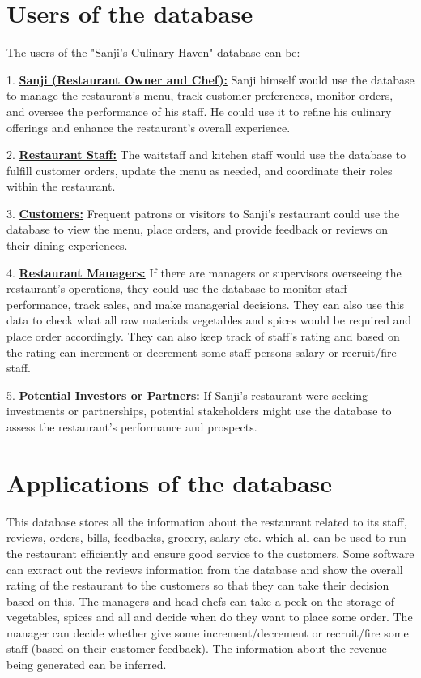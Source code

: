 \documentclass{article}
\begin{document}
\section{Users of the database}
The users of the "Sanji's Culinary Haven" database can be:

1. \underline{\textbf{Sanji (Restaurant Owner and Chef):}} Sanji himself would use the database to manage the restaurant's menu, track customer preferences, monitor orders, and oversee the performance of his staff. He could use it to refine his culinary offerings and enhance the restaurant's overall experience.

2. \underline{\textbf{Restaurant Staff:}} The waitstaff and kitchen staff would use the database to fulfill customer orders, update the menu as needed, and coordinate their roles within the restaurant.

3. \underline{\textbf{Customers:}} Frequent patrons or visitors to Sanji's restaurant could use the database to view the menu, place orders, and provide feedback or reviews on their dining experiences.

4. \underline{\textbf{Restaurant Managers:}} If there are managers or supervisors overseeing the restaurant's operations, they could use the database to monitor staff performance, track sales, and make managerial decisions. They can also use this data to check what all raw materials vegetables and spices would be required and place order accordingly. They can also keep track of staff's rating and based on the rating can increment or decrement some staff persons salary or recruit/fire staff.

5. \underline{\textbf{Potential Investors or Partners:}} If Sanji's restaurant were seeking investments or partnerships, potential stakeholders might use the database to assess the restaurant's performance and prospects.

\section{Applications of the database}
This database stores all the information about the restaurant related to its staff, reviews, orders, bills, feedbacks, grocery, salary etc. which all can be used to run the restaurant efficiently and ensure good service to the customers. Some software can extract out the reviews information from the database and show the overall rating of the restaurant to the customers so that they can take their decision based on this. The managers and head chefs can take a peek on the storage of vegetables, spices and all and decide when do they want to place some order. The manager can decide whether give some increment/decrement or recruit/fire some staff (based on their customer feedback). The information about the revenue being generated can be inferred.
\end{document}
